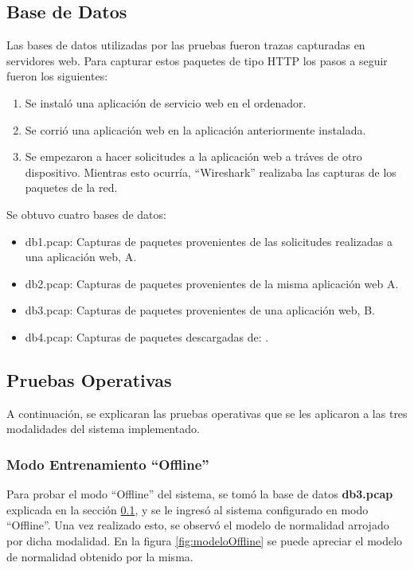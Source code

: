 \subsection{Base de Datos}\label{ssec:DB}

Las bases de datos utilizadas por las pruebas fueron trazas capturadas
en servidores web. Para capturar estos paquetes de tipo HTTP los pasos a
seguir fueron los siguientes:

\begin{enumerate}
\item Se instaló una aplicación de servicio web en el ordenador.
\item Se corrió una aplicación web en la aplicación anteriormente instalada.
\item Se empezaron a hacer solicitudes a la aplicación web a tráves de otro
dispositivo. Mientras esto ocurría, ``Wireshark'' realizaba las capturas
de los paquetes de la red.
\end{enumerate}
Se obtuvo cuatro bases de datos:
\begin{itemize}
\item db1.pcap: Capturas de paquetes provenientes de las solicitudes realizadas a una aplicación web, A.
\item db2.pcap: Capturas de paquetes provenientes de la misma aplicación
web A.
\item db3.pcap: Capturas de paquetes provenientes de una aplicación web,
B.
\item db4.pcap: Capturas de paquetes descargadas de: \cite{wireshark}.
\end{itemize}

\subsection{Pruebas Operativas}

A continuación, se explicaran las pruebas operativas que se les aplicaron
a las tres modalidades del sistema implementado.

\subsubsection{Modo Entrenamiento ``Offline''}

Para probar el modo ``Offline'' del sistema, se tomó la base de datos \textbf{db3.pcap} explicada en la sección \ref{ssec:DB}, y se le ingresó al sistema configurado en modo ``Offline''. Una vez realizado esto, se observó el modelo de
normalidad arrojado por dicha modalidad.
En la figura \ref{fig:modeloOffline} se puede apreciar el modelo de normalidad obtenido
por la misma.

